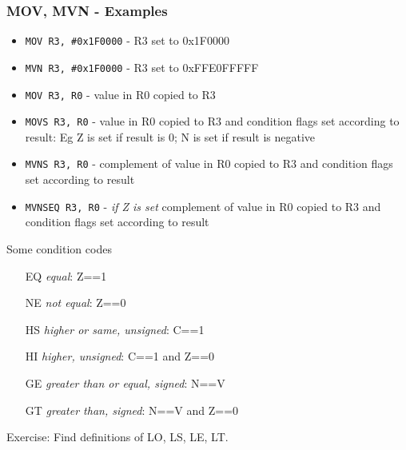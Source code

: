 \documentclass[10pt]{beamer}
\begin{document}
\begin{frame}
\frametitle{MOV, MVN - Examples}
\begin{itemize}
\item \texttt{\color{brown}MOV R3, \#0x1F0000} - R3 set to 0x1F0000
\item \texttt{\color{brown}MVN R3, \#0x1F0000} - R3 set to 0xFFE0FFFFF
\item \texttt{\color{brown}MOV R3, R0} - value in R0 copied to R3
\item \texttt{\color{brown}MOVS R3, R0} - value in R0 copied to R3 and condition flags set according to result: Eg Z is set if result is 0; N is set if result is negative
\item \texttt{\color{brown}MVNS R3, R0} - complement of value in R0 copied to R3 and condition flags set according to result
\item \texttt{\color{brown}MVNSEQ R3, R0} - \emph{if Z is set} complement of value in R0 copied to R3 and condition flags set according to result
\end{itemize}

Some condition codes
\begin{itemize}
\item[EQ] \emph{equal}: Z==1
\item[NE] \emph{not equal}: Z==0
\item[HS] \emph{higher or same, unsigned}: C==1
\item[HI] \emph{higher, unsigned}: C==1 and Z==0
\item[GE] \emph{greater than or equal, signed}: N==V
\item[GT] \emph{greater than, signed}: N==V and Z==0
\end{itemize}

Exercise: Find definitions of LO, LS, LE, LT.
\end{frame}
\end{document}
